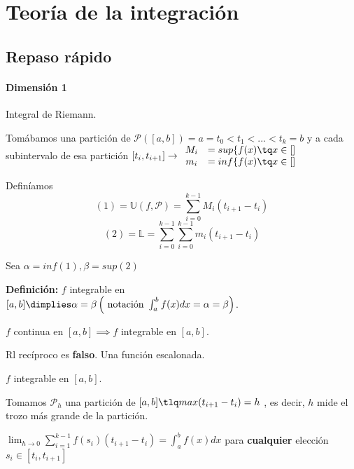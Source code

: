 \section{Teoría de la integración}

\subsection{Repaso rápido}

\paragraph{Dimensión 1} Integral de Riemann.

Tomábamos una partición de $\mathcal{P}([a,b]) = a = t_0 < t_1<...<t_k = b$ y a cada subintervalo de esa partición $[t_i,t_{i+1}] \rightarrow \begin{array}{cc} 
M_i &= sup\{f(x)\tq x\in []\\
m_i &= inf \{f(x)\tq x\in []\end{array}$ 

Definíamos \[(1) = \mathbb{U}(f,\mathcal{P}) = \sum_{i=0}^{k-1} M_i(t_{i+1}-t_i)\]
\[(2) = \mathbb{L} = \sum_{i=0}^{k-1} \sum_{i=0}^{k-1} m_i(t_{i+1}-t_i)\]

Sea $\alpha = inf(1), \beta = sup(2)$

\textbf{Definición:} $f$ integrable en $[a,b] \dimplies \alpha = \beta \left(\text{ notación } \int_a^b f(x)dx = \alpha = \beta\right)$.

\begin{theorem}
$f$ continua en $[a,b] \implies f$ integrable en $[a,b]$.
\end{theorem}

Rl recíproco es \textbf{falso}. Una función escalonada.

\begin{theorem}
$f$ integrable en $[a,b]$.

Tomamos $\mathcal{P}_h$ una partición de $[a,b] \tlq max(t_{i+1}-t_i) = h$ , es decir, $h$ mide el trozo más grande de la partición.

$\lim_{h\rightarrow 0} \sum_{i=1}^{k-1} f(s_i)(t_{i+1}-t_i) = \int_a^bf(x)dx$ para \textbf{cualquier} elección $s_i\in[t_i,t_{i+1}]$	

\end{theorem} 
